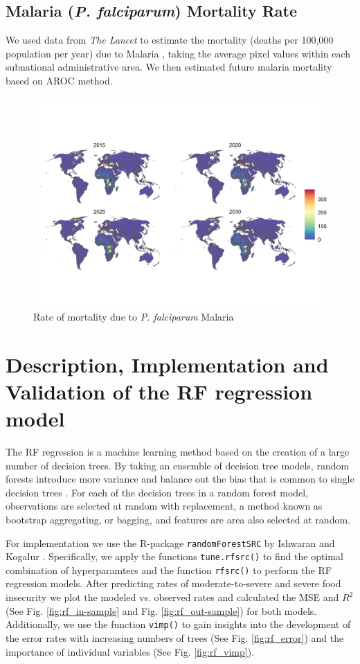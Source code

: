 \documentclass{article}
\begin{document}
\subsection{Malaria (\textit{P. falciparum}) Mortality Rate}
We used data from \textit{The Lancet} to estimate the mortality (deaths per 100,000 population per year) due to Malaria \citep{Weiss2019}, taking the average pixel values within each subnational administrative area.  We then estimated future malaria mortality based on AROC method.

\begin{figure}[H]
  \centering
  \includegraphics[width=\linewidth]{img/covars/mal_falciparum.png}
  \caption{Rate of mortality due to \textit{P. falciparum} Malaria}
\end{figure}

\section{Description, Implementation and Validation of the RF regression model}

The RF regression is a machine learning method based on the creation of a large number of decision trees. By taking an ensemble of decision tree models, random forests introduce more variance and balance out the bias that is common to single decision trees \citep{friedman2001elements}.  For each of the decision trees in a random forest model, observations are selected at random with replacement, a method known as bootstrap aggregating, or bagging, and features are area also selected at random.

For implementation we use the R-package \texttt{randomForestSRC} by Ishwaran and Kogalur \citep{ishwaran2019randomforestsrc}. Specifically, we apply the functions \texttt{tune.rfsrc()} to find the optimal combination of hyperparamters and the function \texttt{rfsrc()} to perform the RF regression models. After predicting rates of moderate-to-severe and severe food insecurity we plot the modeled vs. observed rates and calculated the MSE and ${R}^2$ (See Fig. \ref{fig:rf_in-sample} and Fig. \ref{fig:rf_out-sample}) for both models. Additionally, we use the function \texttt{vimp()} to gain insights into the development of the error rates with increasing numbers of trees (See Fig. \ref{fig:rf_error}) and the importance of individual variables (See Fig. \ref{fig:rf_vimp}).
\end{document}
